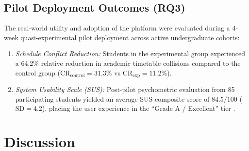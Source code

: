\documentclass[a4paper,fleqn]{cas-dc}
\begin{document}
\subsection{Pilot Deployment Outcomes (RQ3)}
The real-world utility and adoption of the platform were evaluated during a 4-week quasi-experimental pilot deployment across active undergraduate cohorts:
\begin{enumerate}
    \item \textit{Schedule Conflict Reduction:} Students in the experimental group experienced a 64.2\% relative reduction in academic timetable collisions compared to the control group ($\text{CR}_{\text{control}} = 31.3\%$ vs $\text{CR}_{\text{exp}} = 11.2\%$).
    \item \textit{System Usability Scale (SUS):} Post-pilot psychometric evaluation from 85 participating students yielded an average SUS composite score of $84.5 / 100$ ($\text{SD} = 4.2$), placing the user experience in the ``Grade A / Excellent'' tier \cite{bangor2008}.
\end{enumerate}

\section{Discussion}
\label{sec:discussion}
\end{document}
